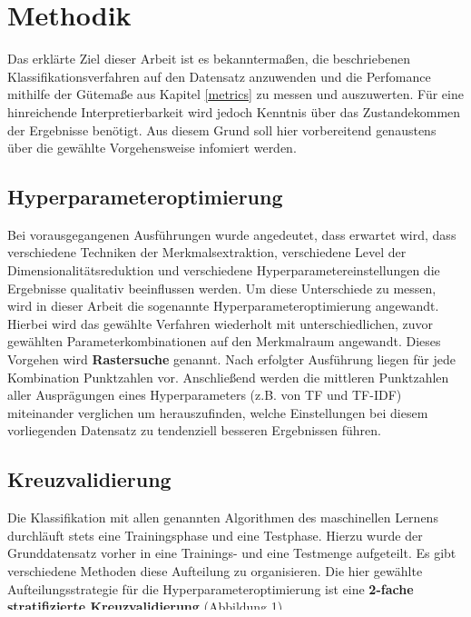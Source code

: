 \section{Methodik}\raggedbottom
Das erklärte Ziel dieser Arbeit ist es bekanntermaßen, die beschriebenen Klassifikationsverfahren auf den Datensatz anzuwenden und die Perfomance mithilfe der Gütemaße aus Kapitel \ref{metrics} zu messen und auszuwerten. Für eine hinreichende Interpretierbarkeit wird jedoch Kenntnis über das Zustandekommen der Ergebnisse benötigt. Aus diesem Grund soll hier vorbereitend genaustens über die gewählte Vorgehensweise infomiert werden.
\subsection{Hyperparameteroptimierung}
Bei vorausgegangenen Ausführungen wurde angedeutet, dass erwartet wird, dass verschiedene Techniken der Merkmalsextraktion, verschiedene Level der Dimensionalitätsreduktion und verschiedene Hyperparametereinstellungen die Ergebnisse qualitativ beeinflussen werden. Um diese Unterschiede zu messen, wird in dieser Arbeit die sogenannte Hyperparameteroptimierung angewandt. Hierbei wird das gewählte Verfahren wiederholt mit unterschiedlichen, zuvor gewählten Parameterkombinationen auf den Merkmalraum angewandt. Dieses Vorgehen wird \textbf{Rastersuche} genannt. Nach erfolgter Ausführung liegen für jede Kombination Punktzahlen vor. Anschließend werden die mittleren Punktzahlen aller Ausprägungen eines Hyperparameters (z.B. von TF und TF-IDF) miteinander verglichen um herauszufinden, welche Einstellungen bei diesem vorliegenden Datensatz zu tendenziell besseren Ergebnissen führen.
\subsection{Kreuzvalidierung}
Die Klassifikation mit allen genannten Algorithmen des maschinellen Lernens durchläuft stets eine Trainingsphase und eine Testphase. Hierzu wurde der Grunddatensatz vorher in eine Trainings- und eine Testmenge aufgeteilt. Es gibt verschiedene Methoden diese Aufteilung zu organisieren. Die hier gewählte Aufteilungsstrategie für die Hyperparameteroptimierung ist eine \textbf{2-fache stratifizierte Kreuzvalidierung} (Abbildung \ref{CV}).\\
\begin{figure}[htb]
	\begin{center}
		\texttt{[image: bilder/cv.jpg]}
		\caption{Zweifache Kreuzvalidierung}\label{CV}
	\end{center}
\end{figure}\\
Bei diesem Verfahren wird der Datensatz in zwei gleich große Mengen aufgeteilt. Die Stratifizierung bedeutet in diesem Zusammenhang, dass die Verteilung der Troll-Tweets und Nichttroll-Tweets in den beiden neu entstehenden Mengen genau wiederhergestellt wird. Im Folgenden wird dann in zwei Durchläufen eines Algorithmus wechselseitig jede der zwei Mengen einmal als Trainings- und einmal als Testmenge verwendet. Das Ergebnis für eine Hyperparameterkombination wird dann aus den Mittelwerten der beiden Durchläufe gebildet.
